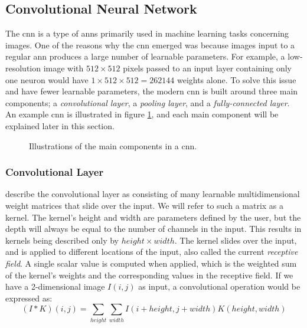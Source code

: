\subsection{Convolutional Neural Network} \label{cnn}
    The \gls{cnn} is a type of \gls{ann}s primarily used in machine learning tasks concerning images\cite{o2015introduction_convolutions}. One of the reasons why the \gls{cnn} emerged was because images input to a regular \gls{ann} produces a large number of learnable parameters. For example, a low-resolution image with $512\times512$ pixels passed to an input layer containing only one neuron would have $1\times512\times512 = 262144$ weights alone.  To solve this issue and have fewer learnable parameters, the modern \gls{cnn} is built around three main components\cite{o2015introduction_convolutions}; a \textit{convolutional layer}, a \textit{pooling layer}, and a \textit{fully-connected layer}. An example \gls{cnn} is illustrated in figure \ref{convolutional_neural_network_fig}, and each main component will be explained later in this section.

    \begin{figure}[H]
        \centering
                        
        \caption[Convolutional neural network example]{Illustrations of the main components in a \gls{cnn}.}
      	\medskip 
        \label{convolutional_neural_network_fig}
    \end{figure}



    \subsubsection{Convolutional Layer}
    
    
     \citeauthor{o2015introduction_convolutions}\cite{o2015introduction_convolutions} describe the convolutional layer as consisting of many learnable multidimensional weight matrices that slide over the input. We will refer to such a matrix as a kernel. The kernel's height and width are parameters defined by the user, but the depth will always be equal to the number of channels in the input. This results in kernels being described only by $height \times width$. The kernel slides over the input, and is applied to different locations of the input, also called the current \textit{receptive field}. A single scalar value is computed when applied, which is the weighted sum of the kernel's weights and the corresponding values in the receptive field. If we have a 2-dimensional image $I(i,j)$ as input, a convolutional operation would be expressed as\cite{Goodfellow-et-al-2016}:
        \begin{equation}
            (I*K)(i,j) = \sum_{height}\sum_{width}I(i+height,j+width)K(height,width)
        \end{equation}
     
